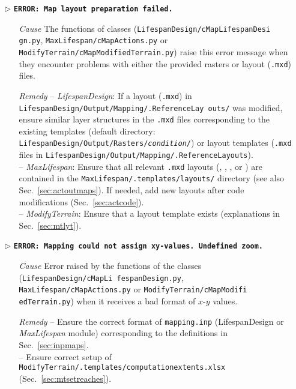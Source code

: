 \begin{itemize}
	\item[$\triangleright$]\textbf{\texttt{ERROR: Map layout preparation failed.}}
	\begin{itemize}
		\item[\textit{Cause}\hspace{0.27cm}] The  functions of  classes (\texttt{LifespanDesign/cMapLifespanDesi gn.py}, \texttt{MaxLifespan/cMapActions.py} or \texttt{ModifyTerrain/cMapModifiedTerrain.py}) raise this error message when they encounter problems with either the provided rasters or layout (\texttt{.mxd}) files.
		\item[\textit{Remedy}] -- \textit{LifespanDesign}: If a layout (\texttt{.mxd}) in \texttt{LifespanDesign/Output/Mapping/.ReferenceLay outs/} was modified, ensure similar layer structures in the \texttt{.mxd} files corresponding to the existing templates  (default directory: \texttt{LifespanDesign/Output/Rasters/\textit{condition}/}) or layout templates (\texttt{.mxd} files in \texttt{LifespanDesign/Output/Mapping/.ReferenceLayouts}).\\
							  -- \textit{MaxLifespan}: Ensure that all relevant \texttt{.mxd} layouts (, , , or ) are contained in the \texttt{MaxLifespan/.templates/layouts/} directory (see also Sec.~\ref{sec:actoutmaps}). If needed, add new layouts after code modifications (Sec.~\ref{sec:actcode}).\\
								-- \textit{ModifyTerrain}: Ensure that a layout template exists (explanations in Sec.~\ref{sec:mtlyt}).\\
	\end{itemize}
	
	\item[$\triangleright$]\textbf{\texttt{ERROR: Mapping could not assign xy-values. Undefined zoom.}}
	\begin{itemize}
		\item[\textit{Cause}\hspace{0.27cm}] Error raised by the  functions of the  classes (\texttt{LifespanDesign/cMapLi fespanDesign.py}, \texttt{MaxLifespan/cMapActions.py} or \texttt{ModifyTerrain/cMapModifi edTerrain.py}) when it receives a bad format of $x$-$y$ values.
		\item[\textit{Remedy}] -- Ensure the correct format of \texttt{mapping.inp} (LifespanDesign or \textit{MaxLifespan} module) corresponding to the definitions in Sec.~\ref{sec:inpmaps}.\\
													 -- Ensure correct setup of \texttt{ModifyTerrain/.templates/computation{\myUnderscore}extents.xlsx}\\(Sec.~\ref{sec:mtsetreaches}).\\
	\end{itemize}
	

\end{itemize}
